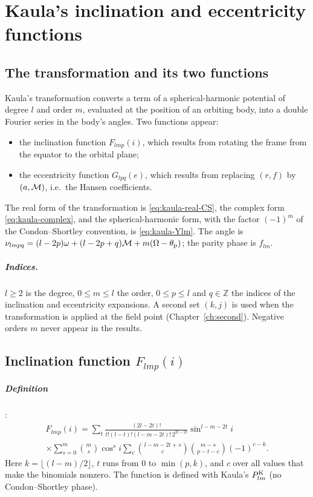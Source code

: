 \chapter{Kaula's inclination and eccentricity functions}\label{app:kaula}

\section{The transformation and its two functions}
Kaula's transformation \citep[\S3.3]{Kaula2000} converts a term of a spherical-harmonic potential of degree $l$ and order $m$, evaluated at the position of an orbiting body, into a double Fourier series in the body's angles. Two functions appear:
\begin{itemize}
  \item the inclination function $F_{lmp}(i)$, which results from rotating the frame from the equator to the orbital plane;
  \item the eccentricity function $G_{lpq}(e)$, which results from replacing $(r,f)$ by $(a,\mathcal{M})$, i.e.\ the Hansen coefficients.
\end{itemize}
The real form of the transformation is \eqref{eq:kaula-real-CS}, the complex form \eqref{eq:kaula-complex}, and the spherical-harmonic form, with the factor $(-1)^m$ of the Condon--Shortley convention, is \eqref{eq:kaula-Ylm}. The angle is $\nu_{lmpq}=(l-2p)\omega+(l-2p+q)\mathcal{M}+m(\Omega-\theta_{\mathrm p})$; the parity phase is $f_{lm}$.

\paragraph{Indices.} $l\ge2$ is the degree, $0\le m\le l$ the order, $0\le p\le l$ and $q\in\mathbb Z$ the indices of the inclination and eccentricity expansions. A second set $(k,j)$ is used when the transformation is applied at the field point (Chapter~\ref{ch:second}). Negative orders $m$ never appear in the results.

\section{Inclination function $F_{lmp}(i)$}
\paragraph{Definition} \citep[eq.~3.62]{Kaula2000}:
\begin{multline}
  F_{lmp}(i)=\sum_t\frac{(2l-2t)!}{t!(l-t)!(l-m-2t)!\,2^{2l-2t}}\sin^{l-m-2t}i\\
  \times\sum_{s=0}^m\binom ms\cos^si\sum_c\binom{l-m-2t+s}{c}\binom{m-s}{p-t-c}(-1)^{c-k}. \label{eq:F-def}
\end{multline}
Here $k=\lfloor(l-m)/2\rfloor$, $t$ runs from 0 to $\min(p,k)$, and $c$ over all values that make the binomials nonzero. The function is defined with Kaula's $P^{\mathrm K}_{lm}$ (no Condon--Shortley phase).

